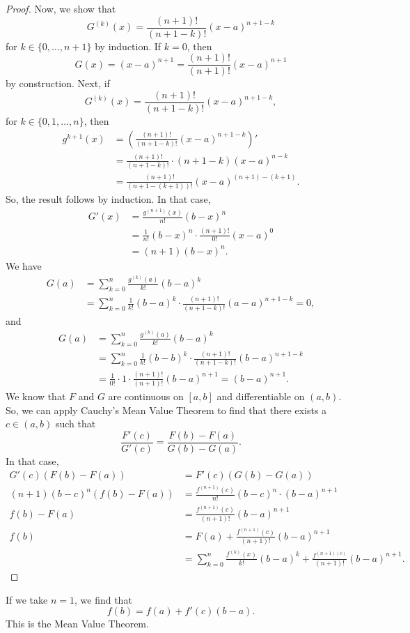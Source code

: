 \documentclass[a4paper, openany]{memoir}
\theoremstyle{definition}
\theoremstyle{plain}
\begin{document}
\begin{proof}
\noindent Now, we show that
\[G^{(k)}(x) = \frac{(n+1)!}{(n+1-k)!} (x-a)^{n+1-k}\]
for $k \in \{0, \dots, n+1\}$ by induction. If $k = 0$, then
\[G(x) = (x-a)^{n+1} = \frac{(n+1)!}{(n+1)!} (x-a)^{n+1}\]
by construction. Next, if 
\[G^{(k)}(x) = \frac{(n+1)!}{(n+1-k)!} (x-a)^{n+1-k},\]
for $k \in \{0, 1, \dots, n\}$, then
\begin{align*}
    g^{k+1}(x) &= \left(\frac{(n+1)!}{(n+1-k)!} (x-a)^{n+1-k}\right)' \\
    &= \frac{(n+1)!}{(n+1-k)!} \cdot (n+1-k) (x-a)^{n-k} \\
    &= \frac{(n+1)!}{(n+1-(k+1))!} (x-a)^{(n+1)-(k+1)}.
\end{align*}
So, the result follows by induction. In that case,
\begin{align*}
    G'(x) &= \frac{g^{(n+1)}(x)}{n!} (b-x)^n \\
    &= \frac{1}{n!} (b-x)^n \cdot \frac{(n+1)!}{0!} (x-a)^0 \\
    &= (n+1) (b-x)^n.
\end{align*}
We have
\begin{align*}
    G(a) &= \sum_{k=0}^n \frac{g^{(k)}(a)}{k!} (b-a)^k \\
    &= \sum_{k=0}^n \frac{1}{k!} (b-a)^k \cdot \frac{(n+1)!}{(n+1-k)!} (a-a)^{n+1-k} = 0,
\end{align*}
and
\begin{align*}
    G(a) &= \sum_{k=0}^n \frac{g^{(k)}(a)}{k!} (b-a)^k \\
    &= \sum_{k=0}^n \frac{1}{k!} (b-b)^k \cdot \frac{(n+1)!}{(n+1-k)!} (b-a)^{n+1-k} \\
    &= \frac{1}{0!} \cdot 1 \cdot \frac{(n+1)!}{(n+1)!} (b-a)^{n+1} = (b-a)^{n+1}.
\end{align*}
We know that $F$ and $G$ are continuous on $[a, b]$ and differentiable on $(a, b)$. So, we can apply Cauchy's Mean Value Theorem to find that there exists a $c \in (a, b)$ such that
\[\frac{F'(c)}{G'(c)} = \frac{F(b) - F(a)}{G(b) - G(a)}.\]
In that case,
\begin{align*}
    G'(c) (F(b) - F(a)) &= F'(c) (G(b) - G(a)) \\
    (n+1)(b-c)^n (f(b) - F(a)) &= \frac{f^{(n+1)}(c)}{n!} (b-c)^n \cdot (b-a)^{n+1} \\
    f(b) - F(a) &= \frac{f^{(n+1)}(c)}{(n+1)!} (b-a)^{n+1} \\
    f(b) &= F(a) + \frac{f^{(n+1)}(c)}{(n+1)!} (b-a)^{n+1} \\
    &= \sum_{k=0}^n \frac{f^{(k)}(x)}{k!} (b-a)^k + \frac{f^{(n+1)(c)}}{(n+1)!} (b-a)^{n+1}.
\end{align*}
\end{proof}
If we take $n = 1$, we find that
\[f(b) = f(a) + f'(c)(b - a).\]
This is the Mean Value Theorem.
\end{document}
